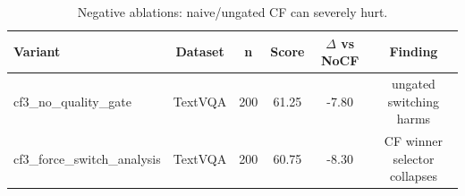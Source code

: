 \begin{table}[t]
\centering
\begin{tabular}{lccccc}
\toprule
Variant & Dataset & n & Score & $\Delta$ vs NoCF & Finding \\
\midrule
cf3_no_quality_gate & TextVQA & 200 & 61.25 & -7.80 & ungated switching harms \\
cf3_force_switch_analysis & TextVQA & 200 & 60.75 & -8.30 & CF winner selector collapses \\
\bottomrule
\end{tabular}
\caption{Negative ablations: naive/ungated CF can severely hurt.}
\label{tab:cf_bad}
\end{table}
